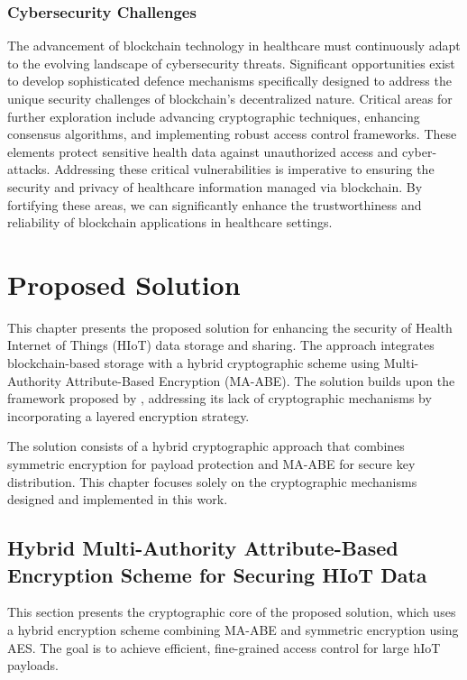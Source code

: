 \documentclass[cic,tc,english]{iiufrgs}
\begin{document}
        \subsection{Cybersecurity Challenges} 
            The advancement of blockchain technology in healthcare must continuously adapt to the evolving landscape of cybersecurity threats. Significant opportunities exist to develop sophisticated defence mechanisms specifically designed to address the unique security challenges of blockchain's decentralized nature. Critical areas for further exploration include advancing cryptographic techniques, enhancing consensus algorithms, and implementing robust access control frameworks. These elements protect sensitive health data against unauthorized access and cyber-attacks. Addressing these critical vulnerabilities is imperative to ensuring the security and privacy of healthcare information managed via blockchain. By fortifying these areas, we can significantly enhance the trustworthiness and reliability of blockchain applications in healthcare settings.

\chapter{Proposed Solution}
    \label{chap:proposedsolution}
    This chapter presents the proposed solution for enhancing the security of Health Internet of Things (HIoT) data storage and sharing. The approach integrates blockchain-based storage with a hybrid cryptographic scheme using Multi-Authority Attribute-Based Encryption (MA-ABE). The solution builds upon the framework proposed by \citet{laura2023}, addressing its lack of cryptographic mechanisms by incorporating a layered encryption strategy.

    The solution consists of a hybrid cryptographic approach that combines symmetric encryption for payload protection and MA-ABE for secure key distribution. This chapter focuses solely on the cryptographic mechanisms designed and implemented in this work.

    \section{Hybrid Multi-Authority Attribute-Based Encryption Scheme for Securing HIoT Data}
    \label{sec:encryption}

        This section presents the cryptographic core of the proposed solution, which uses a hybrid encryption scheme combining MA-ABE and symmetric encryption using AES. The goal is to achieve efficient, fine-grained access control for large hIoT payloads.
\end{document}
